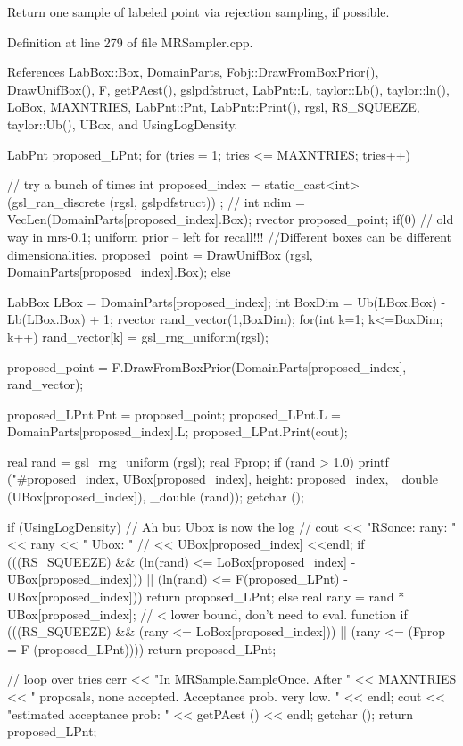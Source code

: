 \-Return one sample of labeled point via rejection sampling, if possible. 



\-Definition at line 279 of file \-M\-R\-Sampler.\-cpp.



\-References \-Lab\-Box\-::\-Box, \-Domain\-Parts, \-Fobj\-::\-Draw\-From\-Box\-Prior(), \-Draw\-Unif\-Box(), \-F, get\-P\-Aest(), gslpdfstruct, \-Lab\-Pnt\-::\-L, taylor\-::\-Lb(), taylor\-::ln(), \-Lo\-Box, \-M\-A\-X\-N\-T\-R\-I\-E\-S, \-Lab\-Pnt\-::\-Pnt, \-Lab\-Pnt\-::\-Print(), rgsl, \-R\-S\-\_\-\-S\-Q\-U\-E\-E\-Z\-E, taylor\-::\-Ub(), \-U\-Box, and \-Using\-Log\-Density.


\begin{DoxyCode}
{

  LabPnt proposed_LPnt;
  for (tries = 1; tries <= MAXNTRIES; tries++)
  {                 // try a bunch of times
    int proposed_index = 
                        static_cast<int>(gsl_ran_discrete (rgsl, gslpdfstruct))
      ;
    //  int ndim = VecLen(DomainParts[proposed_index].Box);
    rvector proposed_point;
    if(0)           // old way in mrs-0.1; uniform prior -- left for recall!!!
    {
      //Different boxes can be different dimensionalities.
      proposed_point = DrawUnifBox (rgsl, DomainParts[proposed_index].Box);
    }
    else
    {
      LabBox LBox = DomainParts[proposed_index];
      int BoxDim = Ub(LBox.Box) - Lb(LBox.Box) + 1;
      rvector rand_vector(1,BoxDim);
      for(int k=1; k<=BoxDim; k++)
      {
        rand_vector[k] = gsl_rng_uniform(rgsl);
      }

      proposed_point = F.DrawFromBoxPrior(DomainParts[proposed_index], 
                                          rand_vector);
    }
    proposed_LPnt.Pnt = proposed_point;
    proposed_LPnt.L = DomainParts[proposed_index].L;
    proposed_LPnt.Print(cout);

    real rand = gsl_rng_uniform (rgsl);
    real Fprop;
    if (rand > 1.0)
    {
      printf
        ("#proposed_index, UBox[proposed_index], height: %
        proposed_index, _double (UBox[proposed_index]), _double (rand));
      getchar ();
    }

    if (UsingLogDensity)
    {
      // Ah but Ubox is now the log
      //   cout << "RSonce: rany: " << rany << "  Ubox: " 
      //        << UBox[proposed_index] <<endl;
      if (((RS_SQUEEZE) && 
           (ln(rand) <= LoBox[proposed_index] - UBox[proposed_index]))
        || (ln(rand) <= F(proposed_LPnt) - UBox[proposed_index]))
      {
        return proposed_LPnt;
      }
    }
    else
    {
      real rany = rand * UBox[proposed_index];
                    // < lower bound, don't need to eval. function
      if (((RS_SQUEEZE) && (rany <= LoBox[proposed_index]))
        || (rany <= (Fprop = F (proposed_LPnt))))
      {
        return proposed_LPnt;
      }
    }
  }                 // loop over tries
  cerr << "In MRSample.SampleOnce. After " << MAXNTRIES
    << " proposals, none accepted. Acceptance prob. very low. " << endl;
  cout << "estimated acceptance prob: " << getPAest () << endl;
  getchar ();
  return proposed_LPnt;
}
\end{DoxyCode}
